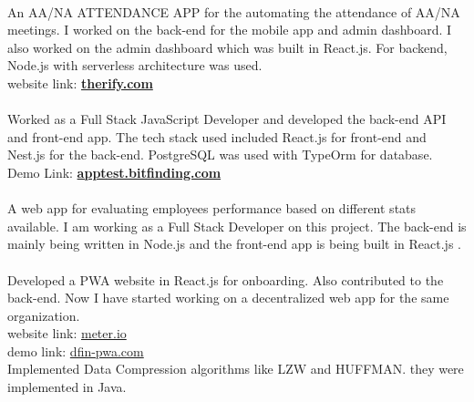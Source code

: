 \documentclass[draft=false]{deedy-resume-openfont}
\begin{document}
\begin{minipage}[t]{0.58\textwidth}
\\An AA/NA ATTENDANCE APP for the automating the attendance of AA/NA meetings. I worked on the back-end for the mobile app and admin dashboard. I also worked on the admin dashboard which was built in React.js. For backend, Node.js with serverless architecture was used. \\
\vspace{0.2cm}
website link: \href{http://therify.com/}{\bf therify.com} \\
\vspace{0.2cm}
\\ Worked as a Full Stack JavaScript Developer and developed the back-end API and front-end app. The tech stack used included React.js for front-end and Nest.js for the back-end. PostgreSQL was used with TypeOrm for database.\\
Demo Link: \href{https://apptest.bitfinding.com}{\bf apptest.bitfinding.com}\\
\vspace{0.2cm}
\\ A web app for evaluating employees performance based on different stats available. I am working as a Full Stack Developer on this project. The back-end is mainly being written in Node.js and the front-end app is being built in React.js .\\
\vspace{0.2cm}
\\ Developed a PWA website in React.js for onboarding. Also contributed to the back-end. Now I have started working on a decentralized web app for the same organization. \\
website link: \href{https://www.meter.io/}{meter.io}\\
demo link: \href{http://dfinlab.s3-website-us-east-1.amazonaws.com/registration}{dfin-pwa.com}\\
\vspace{0.2cm}
 Implemented Data Compression algorithms like LZW and HUFFMAN. they were implemented in Java.
\sectionsep

\end{minipage} 
\end{document}
